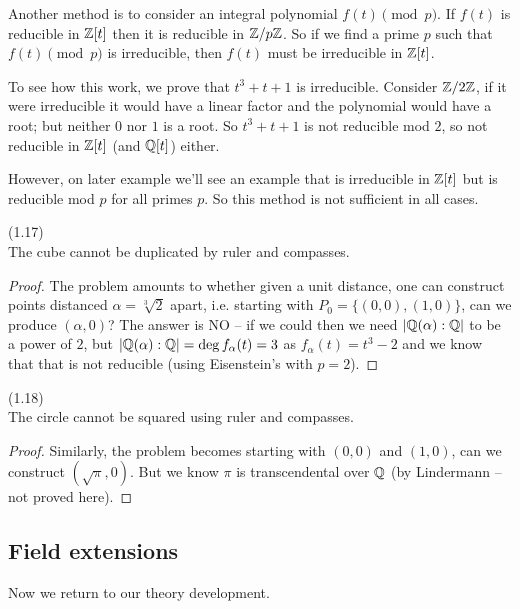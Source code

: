 \documentclass[a4paper]{article}
\begin{document}
Another method is to consider an integral polynomial $f(t) \pmod p$. If $f(t)$ is reducible in $\mathbb{Z}[t]$ then it is reducible in $\mathbb{Z}/p\mathbb{Z}$. So if we find a prime $p$ such that $f(t) \pmod p$ is irreducible, then $f(t)$ must be irreducible in $\mathbb{Z}[t]$.

To see how this work, we prove that $t^3+t+1$ is irreducible. Consider $\mathbb{Z}/2\mathbb{Z}$, if it were irreducible it would have a linear factor and the polynomial would have a root; but neither $0$ nor $1$ is a root. So $t^3+t+1$ is not reducible mod $2$, so not reducible in $\mathbb{Z}[t]$ (and $\mathbb{Q}[t]$) either.

However, on later example we'll see an example that is irreducible in $\mathbb{Z}[t]$ but is reducible mod $p$ for all primes $p$. So this method is not sufficient in all cases.

\begin{thm} (1.17)\\
The cube cannot be duplicated by ruler and compasses.
\begin{proof}
The problem amounts to whether given a unit distance, one can construct points distanced $\alpha=\sqrt[3]{2}$ apart, i.e. starting with $P_0=\{(0,0),(1,0)\}$, can we produce $(\alpha,0)$? The answer is NO -- if we could then we need $|\mathbb{Q}(\alpha):\mathbb{Q}|$ to be a power of $2$, but $|\mathbb{Q}(\alpha):\mathbb{Q}|=\deg f_\alpha(t) = 3$ as $f_\alpha(t) = t^3-2$ and we know that that is not reducible (using Eisenstein's with $p=2$).
\end{proof}
\end{thm}

\begin{thm} (1.18)\\
The circle cannot be squared using ruler and compasses.
\begin{proof}
Similarly, the problem becomes starting with $(0,0)$ and $(1,0)$, can we construct $(\sqrt{\pi},0)$. But we know $\pi$ is transcendental over $\mathbb{Q}$ (by Lindermann -- not proved here).
\end{proof}
\end{thm}

\subsection{Field extensions}
Now we return to our theory development.
\end{document}

